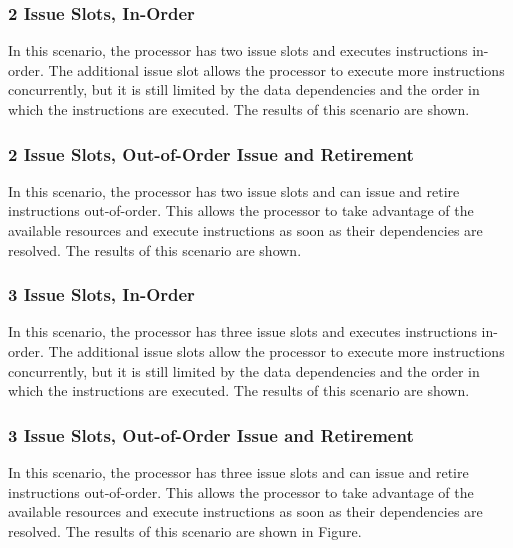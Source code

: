 \documentclass{article}
\begin{document}
\subsubsection{2 Issue Slots, In-Order}
In this scenario, the processor has two issue slots and executes instructions in-order. The additional issue slot allows the processor to execute more instructions concurrently, but it is still limited by the data dependencies and the order in which the instructions are executed. The results of this scenario are shown.
\subsubsection{2 Issue Slots, Out-of-Order Issue and Retirement}
In this scenario, the processor has two issue slots and can issue and retire instructions out-of-order. This allows the processor to take advantage of the available resources and execute instructions as soon as their dependencies are resolved. The results of this scenario are shown.
\subsubsection{3 Issue Slots, In-Order}
In this scenario, the processor has three issue slots and executes instructions in-order. The additional issue slots allow the processor to execute more instructions concurrently, but it is still limited by the data dependencies and the order in which the instructions are executed. The results of this scenario are shown.
\subsubsection{3 Issue Slots, Out-of-Order Issue and Retirement}
In this scenario, the processor has three issue slots and can issue and retire instructions out-of-order. This allows the processor to take advantage of the available resources and execute instructions as soon as their dependencies are resolved. The results of this scenario are shown in Figure.
\end{document}
